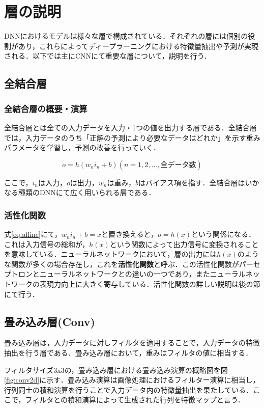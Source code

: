 \documentclass[a4j, 11pt]{jreport}
\begin{document}
\newpage
\section{層の説明}
DNNにおけるモデルは様々な層で構成されている．それぞれの層には個別の役割があり，これらによってディープラーニングにおける特徴量抽出や予測が実現される．以下では主にCNNにて重要な層について，説明を行う．
\subsection{全結合層}
\subsubsection{全結合層の概要・演算}
全結合層とは全ての入力データを入力・1つの値を出力する層である．全結合層では，入力データのうち「正解の予測により必要なデータはどれか」を示す重みパラメータを学習し，予測の改善を行っていく．

\begin{equation}
 o = h(w_n i_n + b)　(n = 1, 2, ... , 全データ数)
 \label{eq:affine}
\end{equation}

ここで，$i_n$は入力，$o$は出力，$w_n$は重み，$b$はバイアス項を指す．全結合層はいかなる種類のDNNにて広く用いられる層である．
\subsubsection{活性化関数}
式\ref{eq:affine}にて，$w_n i_n + b = x$と置き換えると，$o = h(x)$という関係になる．これは入力信号の総和が，$h(x)$という関数によって出力信号に変換されることを意味している．ニューラルネットワークにおいて，層の出力には$h(x)$のような関数が多くの場合存在し，これを\textbf{活性化関数}と呼ぶ．この活性化関数がパーセプトロンとニューラルネットワークとの違いの一つであり，またニューラルネットワークの表現力向上に大きく寄与している．活性化関数の詳しい説明は後の節にて行う．
\subsection{畳み込み層(Conv)}
畳み込み層は，入力データに対しフィルタを適用することで，入力データの特徴抽出を行う層である．畳み込み層において，重みはフィルタの値に相当する．

フィルタサイズ3x3の，畳み込み層における畳み込み演算の概略図を図\ref{fig:conv2d}に示す．畳み込み演算は画像処理におけるフィルター演算に相当し，行列同士の積和演算を行うことで入力データ内の特徴量抽出を果たしている．ここで，フィルタとの積和演算によって生成された行列を特徴マップと言う．
\end{document}
